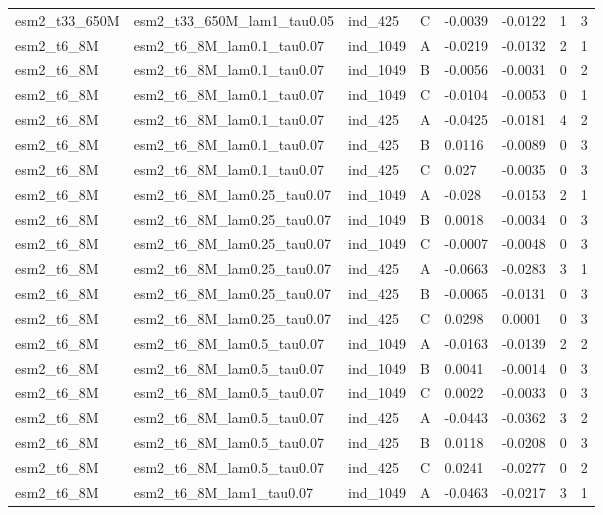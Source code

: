 \begin{table}[ht]
\begin{tabular}{llllllll}
esm2\_t33\_650M & esm2\_t33\_650M\_lam1\_tau0.05 & ind\_425 & C & -0.0039 & -0.0122 & 1 & 3 \\
esm2\_t6\_8M & esm2\_t6\_8M\_lam0.1\_tau0.07 & ind\_1049 & A & -0.0219 & -0.0132 & 2 & 1 \\
esm2\_t6\_8M & esm2\_t6\_8M\_lam0.1\_tau0.07 & ind\_1049 & B & -0.0056 & -0.0031 & 0 & 2 \\
esm2\_t6\_8M & esm2\_t6\_8M\_lam0.1\_tau0.07 & ind\_1049 & C & -0.0104 & -0.0053 & 0 & 1 \\
esm2\_t6\_8M & esm2\_t6\_8M\_lam0.1\_tau0.07 & ind\_425 & A & -0.0425 & -0.0181 & 4 & 2 \\
esm2\_t6\_8M & esm2\_t6\_8M\_lam0.1\_tau0.07 & ind\_425 & B & 0.0116 & -0.0089 & 0 & 3 \\
esm2\_t6\_8M & esm2\_t6\_8M\_lam0.1\_tau0.07 & ind\_425 & C & 0.027 & -0.0035 & 0 & 3 \\
esm2\_t6\_8M & esm2\_t6\_8M\_lam0.25\_tau0.07 & ind\_1049 & A & -0.028 & -0.0153 & 2 & 1 \\
esm2\_t6\_8M & esm2\_t6\_8M\_lam0.25\_tau0.07 & ind\_1049 & B & 0.0018 & -0.0034 & 0 & 3 \\
esm2\_t6\_8M & esm2\_t6\_8M\_lam0.25\_tau0.07 & ind\_1049 & C & -0.0007 & -0.0048 & 0 & 3 \\
esm2\_t6\_8M & esm2\_t6\_8M\_lam0.25\_tau0.07 & ind\_425 & A & -0.0663 & -0.0283 & 3 & 1 \\
esm2\_t6\_8M & esm2\_t6\_8M\_lam0.25\_tau0.07 & ind\_425 & B & -0.0065 & -0.0131 & 0 & 3 \\
esm2\_t6\_8M & esm2\_t6\_8M\_lam0.25\_tau0.07 & ind\_425 & C & 0.0298 & 0.0001 & 0 & 3 \\
esm2\_t6\_8M & esm2\_t6\_8M\_lam0.5\_tau0.07 & ind\_1049 & A & -0.0163 & -0.0139 & 2 & 2 \\
esm2\_t6\_8M & esm2\_t6\_8M\_lam0.5\_tau0.07 & ind\_1049 & B & 0.0041 & -0.0014 & 0 & 3 \\
esm2\_t6\_8M & esm2\_t6\_8M\_lam0.5\_tau0.07 & ind\_1049 & C & 0.0022 & -0.0033 & 0 & 3 \\
esm2\_t6\_8M & esm2\_t6\_8M\_lam0.5\_tau0.07 & ind\_425 & A & -0.0443 & -0.0362 & 3 & 2 \\
esm2\_t6\_8M & esm2\_t6\_8M\_lam0.5\_tau0.07 & ind\_425 & B & 0.0118 & -0.0208 & 0 & 3 \\
esm2\_t6\_8M & esm2\_t6\_8M\_lam0.5\_tau0.07 & ind\_425 & C & 0.0241 & -0.0277 & 0 & 2 \\
esm2\_t6\_8M & esm2\_t6\_8M\_lam1\_tau0.07 & ind\_1049 & A & -0.0463 & -0.0217 & 3 & 1 \\

\end{tabular}
\end{table}
